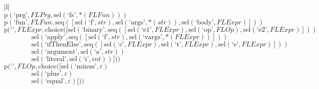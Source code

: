 \footnotesize\begin{center}\begin{tabular}{|l|}\hline
{}
\\\hline
$\mathrm{p}(\text{`prg'},\mathit{FLPrg},\mathrm{sel}\left(\text{`fs'},{*}\left(\mathit{FLFun}\right)\right))$	\\
$\mathrm{p}(\text{`fun'},\mathit{FLFun},\mathrm{seq}\left(\left[\mathrm{sel}\left(\text{`f'},str\right), \mathrm{sel}\left(\text{`args'},{*}\left(str\right)\right), \mathrm{sel}\left(\text{`body'},\mathit{FLExpr}\right)\right]\right))$	\\
$\mathrm{p}(\text{`'},\mathit{FLExpr},\mathrm{choice}([\mathrm{sel}\left(\text{`binary'},\mathrm{seq}\left(\left[\mathrm{sel}\left(\text{`e1'},\mathit{FLExpr}\right), \mathrm{sel}\left(\text{`op'},\mathit{FLOp}\right), \mathrm{sel}\left(\text{`e2'},\mathit{FLExpr}\right)\right]\right)\right)$\\$\qquad\qquad\mathrm{sel}\left(\text{`apply'},\mathrm{seq}\left(\left[\mathrm{sel}\left(\text{`f'},str\right), \mathrm{sel}\left(\text{`vargs'},{*}\left(\mathit{FLExpr}\right)\right)\right]\right)\right)$\\$\qquad\qquad\mathrm{sel}\left(\text{`ifThenElse'},\mathrm{seq}\left(\left[\mathrm{sel}\left(\text{`c'},\mathit{FLExpr}\right), \mathrm{sel}\left(\text{`t'},\mathit{FLExpr}\right), \mathrm{sel}\left(\text{`e'},\mathit{FLExpr}\right)\right]\right)\right)$\\$\qquad\qquad\mathrm{sel}\left(\text{`argument'},\mathrm{sel}\left(\text{`a'},str\right)\right)$\\$\qquad\qquad\mathrm{sel}\left(\text{`literal'},\mathrm{sel}\left(\text{`i'},int\right)\right)]))$	\\
$\mathrm{p}(\text{`'},\mathit{FLOp},\mathrm{choice}([\mathrm{sel}\left(\text{`minus'},\varepsilon\right)$\\$\qquad\qquad\mathrm{sel}\left(\text{`plus'},\varepsilon\right)$\\$\qquad\qquad\mathrm{sel}\left(\text{`equal'},\varepsilon\right)]))$	\\
\hline\end{tabular}\end{center}



